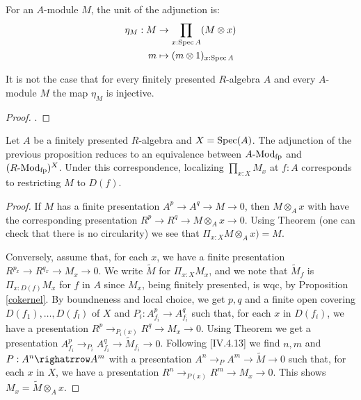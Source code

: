 For an $A$-module $M$,
the unit of the adjunction is:
\begin{align*}
  \eta_M : M &\to \prod_{x : \operatorname{Spec} A} (M \otimes x) \\
  m &\mapsto (m \otimes 1)_{x : \operatorname{Spec} A}
\end{align*}

\begin{example}
  It is not the case that
  for every finitely presented $R$-algebra $A$
  and every $A$-module $M$
  the map $\eta_M$ is injective.
\end{example}

\begin{proof}
  \cite{topology-draft}.
\end{proof}

\begin{theorem}%
  \label{fp-module}
  Let $A$ be a finitely presented $R$-algebra and $X = \operatorname{Spec}(A)$.
  The adjunction of the previous proposition reduces to an equivalence between $A\text{-}\mathrm{Mod}_{\text{fp}}$
  and $(R\text{-}\mathrm{Mod}_{\text{fp}})^{X}$.
  Under this correspondence, localizing $\prod_{x:X}M_x$ at $f:A$ corresponds to restricting $M$ to $D(f)$.
\end{theorem}

\begin{proof}
  If $M$ has a finite presentation $A^p\to A^q\to M\to 0$, then $M\otimes_A x$ with have the corresponding presentation
  $R^p\to R^q\to M\otimes_A x\to 0$. Using Theorem  \label{H1-wqc-module-affine-trivial} (one can check that there is no
  circularity) we see that $\Pi_{x:X}M\otimes_A x) = M$.

  Conversely, assume that, for each $x$, we have a finite presentation $R^{p_x}\to R^{q_x}\to M_x\to 0$.
  We write $\tilde{M}$ for $\Pi_{x:X}M_x$, and we note that $\tilde{M}_f$ is $\Pi_{x:D(f)}M_x$ for $f$ in $A$
  since $M_x$, being finitely presented, is wqc, by Proposition \ref{cokernel}.
  By boundneness and local choice, we get $p,q$ and a finite open covering $D(f_1),\dots,D(f_l)$ of $X$
  and $P_i:A_{f_i}^p\to A_{f_i}^q$ such that, for each $x$ in $D(f_i)$, we have a presentation
  $R^p\to_{P_i(x)} R^q\to M_x\to 0$. Using Theorem  \label{H1-wqc-module-affine-trivial}
  we get a presentation $A_{f_i}^p\to_{P_i} A_{f_i}^q\to \tilde{M}_{f_i}\to 0$.
  Following \cite{lombardi-quitte}[IV.4.13] we find $n,m$ and $P:A^n\righatrrow A^m$ with a presentation
  $A^n\to_P A^m\to \tilde{M}\to 0$ such that, for each $x$ in $X$, we have a presentation
  $R^n\to_{P(x)} R^m\to M_x\to 0$. This shows $M_x = \tilde{M}\otimes_A x$.
\end{proof}


